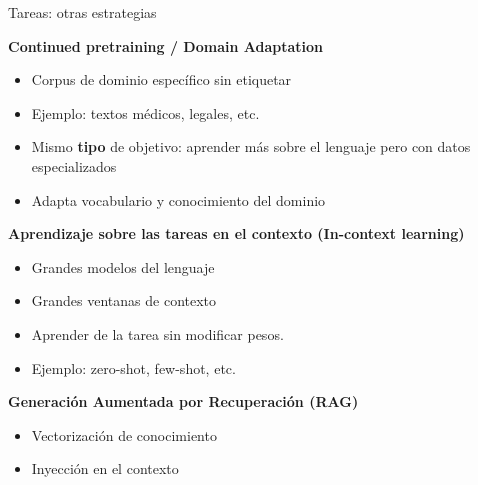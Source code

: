 \begin{frame}{Tareas: otras estrategias}

\textbf{Continued pretraining / Domain Adaptation}
    \begin{itemize}
        \item Corpus de dominio específico sin etiquetar
        \item Ejemplo: textos médicos, legales, etc.
        \item Mismo \textbf{tipo} de objetivo: aprender más sobre el lenguaje pero con datos especializados
        \item Adapta vocabulario y conocimiento del dominio
    \end{itemize}

\textbf{Aprendizaje sobre las tareas en el \textbf{contexto} (In-context learning)}
\begin{itemize} 
    \item Grandes modelos del lenguaje
    \item Grandes ventanas de contexto
    \item Aprender de la tarea sin modificar pesos.
    \item Ejemplo: zero-shot, few-shot, etc.
\end{itemize}

\textbf{Generación Aumentada por Recuperación (\textbf{RAG})}
\begin{itemize}
    \item Vectorización de conocimiento
    \item Inyección en el contexto
\end{itemize}

\end{frame}



